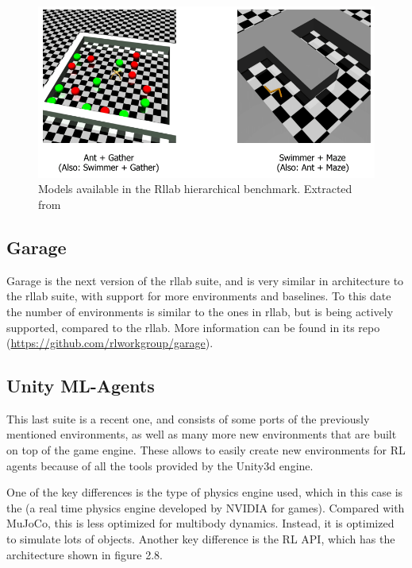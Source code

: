     \begin{figure}[!ht]
        \centering
        \includegraphics[width=5.0in]{./chapters/imgs/img_rllab_envs_hierarchical.png}
        \caption[rllab hierarchical models]{Models available in the Rllab hierarchical benchmark. Extracted from \citet{rllab}}
        \label{fig:rllab-envs-hierarchical}
    \end{figure}

    \subsection{Garage}
    Garage is the next version of the rllab suite, and is very similar in architecture to the rllab suite, with support
    for more environments and baselines. To this date the number of environments is similar to the ones in rllab, but is
    being actively supported, compared to the rllab. More information can be found in its repo (\url{https://github.com/rlworkgroup/garage}).
 
    \subsection{Unity ML-Agents}
    This last suite \citep{unity-ml-agents} is a recent one, and consists of some ports of the previously mentioned environments, as well
    as many more new environments that are built on top of the \citeauthor{unity} game engine. These allows to easily create new environments
    for RL agents because of all the tools provided by the Unity3d engine.

    One of the key differences is the type of physics engine used, which in this case is the \citeauthor{physX} (a real time physics engine
    developed by NVIDIA for games). Compared with MuJoCo, this is less optimized for multibody dynamics. Instead, it is optimized to simulate
    lots of objects. Another key difference is the RL API, which has the architecture shown in figure 2.8.

